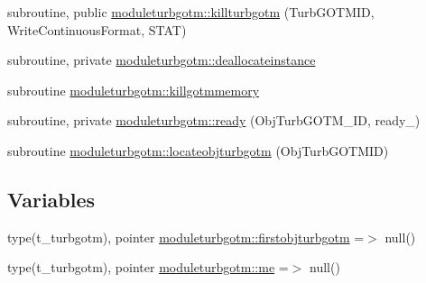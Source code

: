 \begin{DoxyCompactItemize}
\item 
subroutine, public \mbox{\hyperlink{namespacemoduleturbgotm_a59463567a7797fc2bb742f83929626b1}{moduleturbgotm\+::killturbgotm}} (Turb\+G\+O\+T\+M\+ID, Write\+Continuous\+Format, S\+T\+AT)
\item 
subroutine, private \mbox{\hyperlink{namespacemoduleturbgotm_ab38c9de41229ce2e4ae46d12471c0a00}{moduleturbgotm\+::deallocateinstance}}
\item 
subroutine \mbox{\hyperlink{namespacemoduleturbgotm_aad945eb0d5a2d67bc28f53a95bed4242}{moduleturbgotm\+::killgotmmemory}}
\item 
subroutine, private \mbox{\hyperlink{namespacemoduleturbgotm_a8b59a232d6c61837f14e169cef43d695}{moduleturbgotm\+::ready}} (Obj\+Turb\+G\+O\+T\+M\+\_\+\+ID, ready\+\_\+)
\item 
subroutine \mbox{\hyperlink{namespacemoduleturbgotm_a2445ccc2c59cf2ae892fd78dda123a3d}{moduleturbgotm\+::locateobjturbgotm}} (Obj\+Turb\+G\+O\+T\+M\+ID)
\end{DoxyCompactItemize}
\subsection*{Variables}
\begin{DoxyCompactItemize}
\item 
type(t\+\_\+turbgotm), pointer \mbox{\hyperlink{namespacemoduleturbgotm_a16f7125a4269b004133d50c21b100a9d}{moduleturbgotm\+::firstobjturbgotm}} =$>$ null()
\item 
type(t\+\_\+turbgotm), pointer \mbox{\hyperlink{namespacemoduleturbgotm_ac86f138c93eff7a297646af1cbe15166}{moduleturbgotm\+::me}} =$>$ null()
\end{DoxyCompactItemize}
